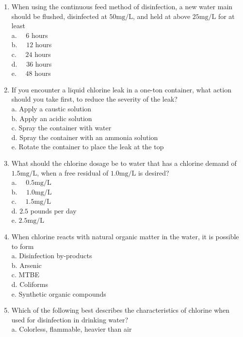 \begin{enumerate}
\item When using the continuous feed method of disinfection, a new water main should be flushed, disinfected at $50 \mathrm{mg} / \mathrm{L}$, and held at above $25 \mathrm{mg} / \mathrm{L}$ for at least\\
a. $\quad 6$ hours\\
b. $\quad 12$ hours\\
c. $\quad 24$ hours\\
d. $\quad 36$ hours\\
e. $\quad 48$ hours\\
  \item If you encounter a liquid chlorine leak in a one-ton container, what action should you take first, to reduce the severity of the leak?\\
a. Apply a caustic solution\\
b. Apply an acidic solution\\
c. Spray the container with water\\
d. Spray the container with an ammonia solution\\
e. Rotate the container to place the leak at the top\\
  \item What should the chlorine dosage be to water that has a chlorine demand of $1.5 \mathrm{mg} / \mathrm{L}$, when a free residual of $1.0 \mathrm{mg} / \mathrm{L}$ is desired?\\
a. $\quad 0.5 \mathrm{mg} / \mathrm{L}$\\
b. $\quad 1.0 \mathrm{mg} / \mathrm{L}$\\
c. $\quad 1.5 \mathrm{mg} / \mathrm{L}$\\
d. $2.5$ pounds per day\\
e. $2.5 \mathrm{mg} / \mathrm{L}$\\
  \item When chlorine reacts with natural organic matter in the water, it is possible to form\\
a. Disinfection by-products \\
b. Arsenic \\
c. MTBE \\
d. Coliforms\\
e. Synthetic organic compounds\\
\item Which of the following best describes the characteristics of chlorine when used for disinfection in drinking water?\\
a.	 Colorless, flammable, heavier than air\\

\end{enumerate}
